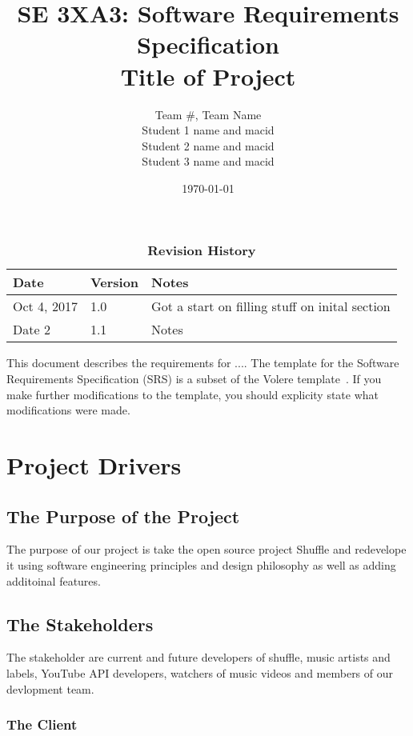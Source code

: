 \documentclass[12pt, titlepage]{article}
\title{SE 3XA3: Software Requirements Specification\\Title of Project}
\author{Team \#, Team Name
		\\ Student 1 name and macid
		\\ Student 2 name and macid
		\\ Student 3 name and macid
}
\date{\today}
\begin{document}
\maketitle

\tableofcontents
\listoftables
\listoffigures

\begin{table}[bp]
\caption{\bf Revision History}
\begin{tabularx}{\textwidth}{p{3cm}p{2cm}X}
\toprule {\bf Date} & {\bf Version} & {\bf Notes}\\
\midrule
Oct 4, 2017 & 1.0 & Got a start on filling stuff on inital section\\
Date 2 & 1.1 & Notes\\
\bottomrule
\end{tabularx}
\end{table}

\newpage


This document describes the requirements for ....  The template for the Software
Requirements Specification (SRS) is a subset of the Volere
template~\citep{RobertsonAndRobertson2012}.  If you make further modifications
to the template, you should explicity state what modifications were made.

\section{Project Drivers}

\subsection{The Purpose of the Project}

The purpose of our project is take the open source project Shuffle and redevelope it using software engineering principles and design philosophy as well as adding additoinal features.

\subsection{The Stakeholders}

The stakeholder are current and future developers of shuffle, music artists and labels, YouTube API developers, watchers of music videos and members of our devlopment team.

\subsubsection{The Client}
\end{document}

